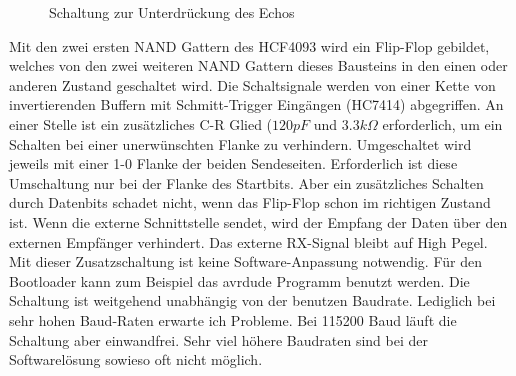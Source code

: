 \begin{figure}[H]
\centering
{}
\caption{Schaltung zur Unterdrückung des Echos}
\label{fig:onewire}
\end{figure}

Mit den zwei ersten NAND Gattern des HCF4093 wird ein Flip-Flop gebildet,
welches von den zwei weiteren NAND Gattern dieses Bausteins
in den einen oder anderen Zustand geschaltet wird. Die Schaltsignale werden von
einer Kette von invertierenden Buffern mit Schmitt-Trigger Eingängen (HC7414) abgegriffen.
An einer Stelle ist ein zusätzliches C-R Glied (\(120 pF\) und \(3.3 k\Omega\) erforderlich,
um ein Schalten bei einer unerwünschten Flanke zu verhindern.
Umgeschaltet wird jeweils mit einer 1-0 Flanke der beiden Sendeseiten.
Erforderlich ist diese Umschaltung nur bei der Flanke des Startbits.
Aber ein zusätzliches Schalten durch Datenbits schadet nicht, wenn das Flip-Flop schon im
richtigen Zustand ist. Wenn die externe Schnittstelle sendet, wird der Empfang der
Daten über den externen Empfänger verhindert. Das externe RX-Signal bleibt auf High Pegel.
Mit dieser Zusatzschaltung ist keine Software-Anpassung notwendig. Für den
Bootloader kann zum Beispiel das avrdude Programm benutzt werden.
Die Schaltung ist weitgehend unabhängig von der benutzen Baudrate.
Lediglich bei sehr hohen Baud-Raten erwarte ich Probleme. Bei 115200 Baud läuft die Schaltung
aber einwandfrei. Sehr viel höhere Baudraten sind bei der Softwarelösung sowieso
oft nicht möglich.

